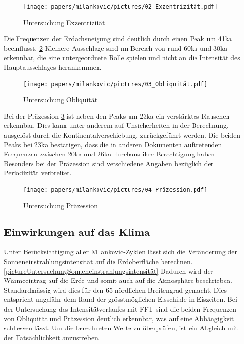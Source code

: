 \begin{figure}
	\centering
	\texttt{[image: papers/milankovic/pictures/02\_Exzentrizität.pdf]}
	\caption{Untersuchung Exzentrizität
		\label{pictureUntersuchungExzentrizität}}
\end{figure}

Die Frequenzen der Erdachsneigung sind deutlich durch einen Peak um 41ka beeinflusst.
	\ref{pictureUntersuchungObliquität}
Kleinere Ausschläge sind im Bereich von rund 60ka und 30ka erkennbar, die eine untergeordnete Rolle spielen und nicht an die Intensität des Hauptausschlages herankommen.

\begin{figure}
	\centering
	\texttt{[image: papers/milankovic/pictures/03\_Obliquität.pdf]}
	\caption{Untersuchung Obliquität
		\label{pictureUntersuchungObliquität}}
\end{figure}

Bei der Präzession
\ref{pictureUntersuchungPräzession}
ist neben den Peaks um 23ka ein verstärktes Rauschen erkennbar.
Dies kann unter anderem auf Unsicherheiten in der Berechnung, ausgelöst durch die Kontinentalverschiebung, zurückgeführt werden.
Die beiden Peaks bei 23ka bestätigen, dass die in anderen Dokumenten auftretenden Frequenzen zwischen 20ka und 26ka durchaus ihre Berechtigung haben.
Besonders bei der Präzession sind verschiedene Angaben bezüglich der Periodizität verbreitet.


\begin{figure}
	\centering
	\texttt{[image: papers/milankovic/pictures/04\_Präzession.pdf]}
	\caption{Untersuchung Präzession
		\label{pictureUntersuchungPräzession}}
\end{figure}

\subsection{Einwirkungen auf das Klima
\label{milankovic:subsection:EinwirkungenKlima}}
Unter Berücksichtigung aller Milankovic-Zyklen lässt sich die Veränderung der Sonneneinstrahlungsintensität auf die Erdoberfläche berechnen.
\ref{pictureUntersuchungSonneneinstrahlungsintensität}
Dadurch wird der Wärmeeintrag auf die Erde und somit auch auf die Atmosphäre beschrieben. Standardmässig wird dies für den 65 nördlichen Breitengrad gemacht.
Dies entspricht ungefähr dem Rand der grösstmöglichen Eisschilde in Eiszeiten.
Bei der Untersuchung des Intensitätverlaufes mit FFT sind die beiden Frequenzen von Obliquität und Präzession deutlich erkennbar, was auf eine Abhängigkeit schliessen lässt.
Um die berechneten Werte zu überprüfen, ist ein Abgleich mit der Tatsächlichkeit anzustreben.

